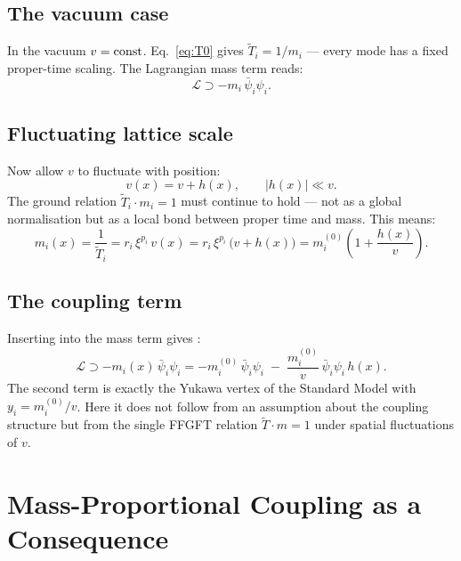 \subsection{The vacuum case}

In the vacuum $v = {\rm const}$. Eq.~\eqref{eq:T0} gives
$\tilde T_i = 1/m_i$ --- every mode has a fixed proper-time scaling.
The Lagrangian mass term reads:
\begin{equation}
  \mathcal L \supset -m_i\,\bar\psi_i\psi_i.
\end{equation}

\subsection{Fluctuating lattice scale}

Now allow $v$ to fluctuate with position:
\begin{equation}
  v(x) = v + h(x), \qquad |h(x)| \ll v.
\end{equation}
The ground relation $\tilde T_i\cdot m_i = 1$ must continue to hold --- not
as a global normalisation but as a local bond between proper time and mass.
This means:
\begin{equation}
  m_i(x) = \frac{1}{\tilde T_i} = r_i\,\xi^{p_i}\,v(x)
  = r_i\,\xi^{p_i}\,\bigl(v + h(x)\bigr)
  = m_i^{(0)}\!\left(1 + \frac{h(x)}{v}\right).
  \label{eq:m_local}
\end{equation}

\subsection{The coupling term}

Inserting into the mass term gives \BM:
\begin{equation}
  \mathcal L \supset -m_i(x)\,\bar\psi_i\psi_i
  = -m_i^{(0)}\,\bar\psi_i\psi_i
    \;-\; \frac{m_i^{(0)}}{v}\,\bar\psi_i\psi_i\,h(x).
  \label{eq:yukawa_derived}
\end{equation}
The second term is exactly the Yukawa vertex of the Standard Model with
$y_i = m_i^{(0)}/v$. Here it does not follow from an assumption about the
coupling structure but from the single FFGFT relation $\tilde T\cdot m = 1$
under spatial fluctuations of $v$.

\section{Mass-Proportional Coupling as a Consequence}

